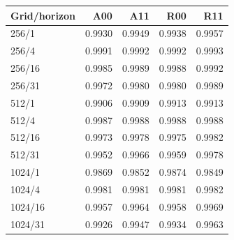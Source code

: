 \begin{tabular}{lrrrr}
\toprule
Grid/horizon & A00 & A11 & R00 & R11 \\
\midrule
256/1 & 0.9930 & 0.9949 & 0.9938 & 0.9957 \\
256/4 & 0.9991 & 0.9992 & 0.9992 & 0.9993 \\
256/16 & 0.9985 & 0.9989 & 0.9988 & 0.9992 \\
256/31 & 0.9972 & 0.9980 & 0.9980 & 0.9989 \\
512/1 & 0.9906 & 0.9909 & 0.9913 & 0.9913 \\
512/4 & 0.9987 & 0.9988 & 0.9988 & 0.9988 \\
512/16 & 0.9973 & 0.9978 & 0.9975 & 0.9982 \\
512/31 & 0.9952 & 0.9966 & 0.9959 & 0.9978 \\
1024/1 & 0.9869 & 0.9852 & 0.9874 & 0.9849 \\
1024/4 & 0.9981 & 0.9981 & 0.9981 & 0.9982 \\
1024/16 & 0.9957 & 0.9964 & 0.9958 & 0.9969 \\
1024/31 & 0.9926 & 0.9947 & 0.9934 & 0.9963 \\
\bottomrule
\end{tabular}
